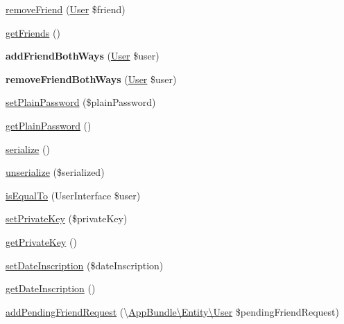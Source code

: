 \begin{DoxyCompactItemize}
\item 
\hyperlink{classAppBundle_1_1Entity_1_1User_a2f11445931ce2da98849005f7818577b}{remove\+Friend} (\hyperlink{classAppBundle_1_1Entity_1_1User}{User} \$friend)
\item 
\hyperlink{classAppBundle_1_1Entity_1_1User_aedd7fe474663d7d06a917dd6862ab6db}{get\+Friends} ()
\item 
\mbox{\label{classAppBundle_1_1Entity_1_1User_a233d60bd0f45895227c6e56942dbf559}} 
{\bfseries add\+Friend\+Both\+Ways} (\hyperlink{classAppBundle_1_1Entity_1_1User}{User} \$user)
\item 
\mbox{\label{classAppBundle_1_1Entity_1_1User_ad6d2942e951c6fbeb9b4e6d72eecc579}} 
{\bfseries remove\+Friend\+Both\+Ways} (\hyperlink{classAppBundle_1_1Entity_1_1User}{User} \$user)
\item 
\hyperlink{classAppBundle_1_1Entity_1_1User_abfd09d2156ac2c22b69a04690fd6977c}{set\+Plain\+Password} (\$plain\+Password)
\item 
\hyperlink{classAppBundle_1_1Entity_1_1User_a5cdc0aeccfeb1a06f9fa8d9032545ebf}{get\+Plain\+Password} ()
\item 
\hyperlink{classAppBundle_1_1Entity_1_1User_aea0ec322bcefd3f64da757770bb3a8a8}{serialize} ()
\item 
\hyperlink{classAppBundle_1_1Entity_1_1User_a35b5a8b6198e5c57b7cc176ba46c19d0}{unserialize} (\$serialized)
\item 
\hyperlink{classAppBundle_1_1Entity_1_1User_a6e8354db28000b0b61faace41a09ff7f}{is\+Equal\+To} (User\+Interface \$user)
\item 
\hyperlink{classAppBundle_1_1Entity_1_1User_a9a31aabdc1f483e3fab33c4c4d52b503}{set\+Private\+Key} (\$private\+Key)
\item 
\hyperlink{classAppBundle_1_1Entity_1_1User_a76dfaf3327def5913cee32e0bd91afaa}{get\+Private\+Key} ()
\item 
\hyperlink{classAppBundle_1_1Entity_1_1User_ac87d00e19c676f595d46bf4b0e203595}{set\+Date\+Inscription} (\$date\+Inscription)
\item 
\hyperlink{classAppBundle_1_1Entity_1_1User_ac33fea30003f3b00cdf87f0251bab415}{get\+Date\+Inscription} ()
\item 
\hyperlink{classAppBundle_1_1Entity_1_1User_ac8d0736d889ebc08338ad70f69765369}{add\+Pending\+Friend\+Request} (\textbackslash{}\hyperlink{classAppBundle_1_1Entity_1_1User}{App\+Bundle\textbackslash{}\+Entity\textbackslash{}\+User} \$pending\+Friend\+Request)

\end{DoxyCompactItemize}
